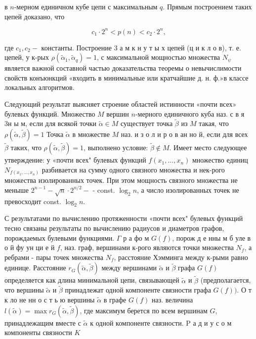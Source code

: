 \documentclass[10pt]{article}
\begin{document}
в $n$-мерном единичном кубе цепи с максимальным $q$. Прямым построением таких цепей доказано, что



\[

c_{1} \cdot 2^{n}<p(n)<c_{2} \cdot 2^{n},

\]



где $c_{1}, c_{2}-$ константы. Построение 3 а м к н у т ы х цепей (ц и к л о в), т. е. цепей, у к-рых $\rho\left(\tilde{\alpha}_{1}, \tilde{\alpha}_{q}\right)=1$, с максимальной мощностью множества $N_{\psi}$ является важной составной частью доказательства теоремы о невычислимости свойств конъюнкций «входить в минимальные или кратчайшие д. н. ф.»в классе локальных алгоритмов.



Следующий результат выясняет строение областей истинности «почти всех» булевых функций. Множество $M$ вершин $n$-мерного единичного куба наз. с в я 3н ы м, если для всякой точки $\tilde{\alpha} \in M$ существует точка $\tilde{\beta}$ из $M$ такая, что $\rho(\tilde{\alpha}, \tilde{\beta})=1$ Точка $\tilde{\alpha}$ в множестве $M$ наз. и з о л и р о в ан но й, если для всех $\tilde{\beta}$ таких, что $\rho(\tilde{\alpha}, \tilde{\beta})=1$, выполнено условие: $\tilde{\beta} \notin M$. Имеет место следующее утверждение: у «почти всех" булевых функций $f\left(x_{1}, \ldots, x_{n}\right)$ множество единиц $N_{f\left(x_{1}, \ldots, x_{n}\right)}$ разбивается на сумму одного связного множества и нек-рого множества изолированных точек. При этом мощность связного множества не меныше $2^{n-1}-\sqrt{n} \cdot 2^{n / 2}-$ - const. $\log _{2} n$, а число изолированных точек не превосходит const. $\log _{2} n$.



С результатами по вычислению протяженности «почти всех" булевых функций тесно связаны результаты по вычислению радиусов и диаметров графов, порождаемых булевыми функциями. $\Gamma$ р а фо м $G(f)$, порож д е нны м б уле в о й фу ун ци е й $f$, наз. граф, вершинами к-рого являются точки множества $N_{f}$, а ребрами - пары точек множества $N_{f}$, расстояние Хэмминга между к-рыми равно единице. Расстояние $r_{G}(\tilde{\alpha}, \tilde{\beta})$ между вершинами $\tilde{\alpha}$ и $\tilde{\beta}$ графа $G(f)$ определяется как длина минимальной цепи, связывающей $\tilde{\alpha}$ и $\tilde{\beta}$ (предполагается, что вершины $\tilde{\alpha}$ и $\tilde{\beta}$ принадлежат одной компоненте связности графа $G(f))$. О т к ло не нн о с т ь ю вершины $\tilde{\alpha}$ в графе $G(f)$ наз. величина $l(\tilde{\alpha})=\max r_{G}(\tilde{\alpha}, \tilde{\beta})$, где максимум берется по всем вершинам $G$, принадлежащим вместе с $\tilde{\alpha}$ к одной компоненте связности. $\mathrm{P}$ а д и у с о м компоненты связности $K$
\end{document}
